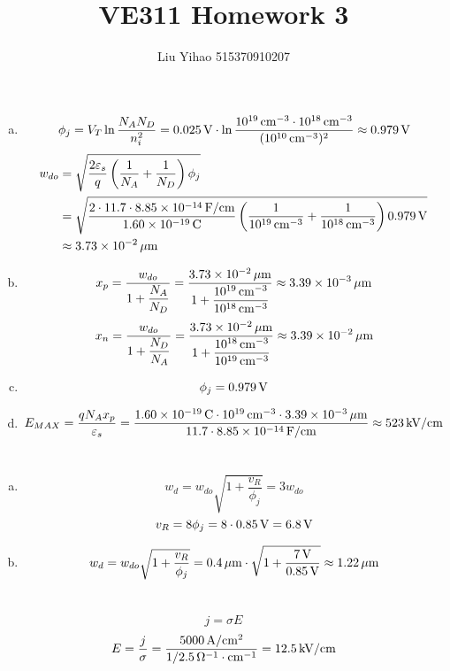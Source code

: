 \documentclass{article}
\title{VE311 Homework 3}
\author{Liu Yihao 515370910207}
\date{}
\newcommand{\unit}[1]{{\rm\,#1}}
\begin{document}
\maketitle

\section{}
\begin{enumerate}[(a)]
\item
$$\phi_j=V_T\ln\frac{N_AN_D}{n_i^2}=0.025\unit{V}\cdot\ln\frac{10^{19}\unit{cm^{-3}}\cdot10^{18}\unit{cm^{-3}}}{(10^{10}\unit{cm^{-3}})^2}\approx0.979\unit{V}$$
\begin{align*}
w_{do}&=\sqrt{\frac{2\varepsilon_s}{q}\left(\frac{1}{N_A}+\frac{1}{N_D}\right)\phi_j}\\
&=\sqrt{\frac{2\cdot11.7\cdot8.85\times10^{-14}\unit{F/cm}}{1.60\times10^{-19}\unit{C}}\left(\frac{1}{10^{19}\unit{cm^{-3}}}+\frac{1}{10^{18}\unit{cm^{-3}}}\right)0.979\unit{V}}\\
&\approx3.73\times10^{-2}\unit{\mu m}
\end{align*}
\item
$$x_p=\frac{w_{do}}{1+\dfrac{N_A}{N_D}}=\frac{3.73\times10^{-2}\unit{\mu m}}{1+\dfrac{10^{19}\unit{cm^{-3}}}{10^{18}\unit{cm^{-3}}}}\approx3.39\times10^{-3}\unit{\mu m}$$
$$x_n=\frac{w_{do}}{1+\dfrac{N_D}{N_A}}=\frac{3.73\times10^{-2}\unit{\mu m}}{1+\dfrac{10^{18}\unit{cm^{-3}}}{10^{19}\unit{cm^{-3}}}}\approx3.39\times10^{-2}\unit{\mu m}$$
\item
$$\phi_j=0.979\unit{V}$$
\item
$$E_{MAX}=\frac{qN_Ax_p}{\varepsilon_s}=\frac{1.60\times10^{-19}\unit{C}\cdot10^{19}\unit{cm^{-3}}\cdot3.39\times10^{-3}\unit{\mu m}}{11.7\cdot8.85\times10^{-14}\unit{F/cm}}\approx523\unit{kV/cm}$$
\end{enumerate}

\section{}
\begin{enumerate}[(a)]
\item
$$w_d=w_{do}\sqrt{1+\frac{v_R}{\phi_j}}=3w_{do}$$
$$v_R=8\phi_j=8\cdot0.85\unit{V}=6.8\unit{V}$$
\item
$$w_d=w_{do}\sqrt{1+\frac{v_R}{\phi_j}}=0.4\unit{\mu m}\cdot\sqrt{1+\frac{7\unit{V}}{0.85\unit{V}}}\approx1.22\unit{\mu m}$$
\end{enumerate}

\section{}
$$j=\sigma E$$
$$E=\frac{j}{\sigma}=\frac{5000\unit{A/cm^2}}{1/2.5\unit{\Omega^{-1}\cdot cm^{-1}}}=12.5\unit{kV/cm}$$

\section{}
\end{document}
